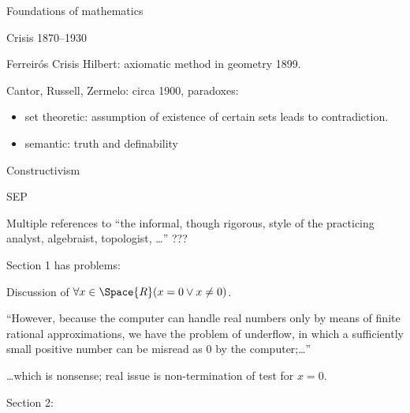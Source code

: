 \begin{plSection}{Foundations of mathematics}
\begin{plSection}{Crisis 1870--1930}
\begin{plSection}{Ferreir\'{o}s Crisis}
Hilbert: axiomatic method in geometry 1899.

Cantor, Russell, Zermelo: circa 1900, paradoxes:
\begin{itemize}
  \item set theoretic: assumption of existence of certain sets
  leads to contradiction.
  \item semantic: truth and definability
\end{itemize}

\end{plSection}%
\end{plSection}%

\begin{plSection}{Constructivism}
\label{sec:Constructivism}
\begin{plSection}{SEP}
\label{sec:Constructivism_SEP}
\cite{sep:ConstructiveMathematics}

Multiple references to ``the informal, though rigorous, 
style of the practicing analyst, algebraist, topologist, \ldots''
???

Section 1 has problems:

Discussion of
$ \forall x \in \Space{R} (x = 0 \vee x \ne 0)$.

``However, because the computer can handle real numbers 
only by means of finite rational approximations, 
we have the problem of underflow, 
in which a sufficiently small positive number can be misread as 0 
by the computer;\ldots''

\ldots which is nonsense;
real issue is non-termination of test for $x=0$.

Section 2:


\end{plSection}
\end{plSection}
\end{plSection}

